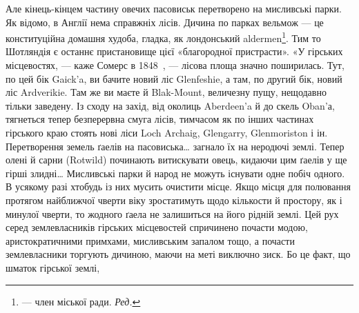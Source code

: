 Але кінець-кінцем частину овечих пасовиськ перетворено
на мисливські парки. Як відомо, в Англії нема справжніх лісів.
Дичина по парках вельмож — це конституційна домашня худоба,
гладка, як лондонський aldermen\footnote*{
— член міської ради. \emph{Ред.}
}. Тим то Шотляндія є останнє
пристановище цієї «благородної пристрасти». «У гірських місцевостях,
— каже Сомерс в 1848~, — лісова площа значно
поширилась. Тут, по цей бік Gaick’a, ви бачите новий ліс Glenfeshie,
а там, по другий бік, новий ліс Ardverikie. Там же ви маєте
й Blak-Mount, величезну пущу, нещодавно тільки заведену.
Із сходу на захід, від околиць Aberdeen’a й до скель Oban’а,
тягнеться тепер безперервна смуга лісів, тимчасом як по інших
частинах гірського краю стоять нові ліси Loch Archaig, Glengarry,
Glenmoriston і ін. Перетворення земель ґаелів на пасовиська\dots{}
загнало їх на неродючі землі. Тепер олені й сарни (Rotwild)
починають витискувати овець, кидаючи цим ґаелів у ще
гірші злидні\dots{} Мисливські парки й народ не можуть існувати
одне побіч одного. В усякому разі хтобудь із них мусить очистити
місце. Якщо місця для полювання протягом найближчої чверти
віку зростатимуть щодо кількости й простору, як і минулої
чверти, то жодного ґаела не залишиться на його рідній землі.
Цей рух серед землевласників гірських місцевостей спричинено
почасти модою, аристократичними примхами, мисливським запалом
тощо, а почасти землевласники торгують дичиною, маючи
на меті виключно зиск. Бо це факт, що шматок гірської землі,
\parbreak{}  %
